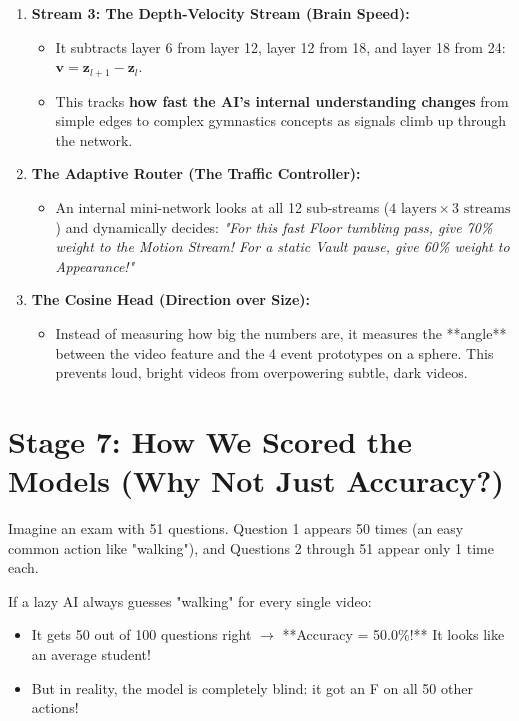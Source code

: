 \documentclass[a4paper, 11pt]{article}
\begin{document}
\begin{examplebox}
\begin{enumerate}
    \item \textbf{Stream 3: The Depth-Velocity Stream (Brain Speed):}
    \begin{itemize}
        \item It subtracts layer 6 from layer 12, layer 12 from 18, and layer 18 from 24: $\mathbf{v} = \mathbf{z}_{l+1} - \mathbf{z}_l$.
        \item This tracks \textbf{how fast the AI's internal understanding changes} from simple edges to complex gymnastics concepts as signals climb up through the network.
    \end{itemize}

    \item \textbf{The Adaptive Router (The Traffic Controller):}
    \begin{itemize}
        \item An internal mini-network looks at all 12 sub-streams ($4\text{ layers} \times 3\text{ streams}$) and dynamically decides: \textit{"For this fast Floor tumbling pass, give 70\% weight to the Motion Stream! For a static Vault pause, give 60\% weight to Appearance!"}
    \end{itemize}

    \item \textbf{The Cosine Head (Direction over Size):}
    \begin{itemize}
        \item Instead of measuring how big the numbers are, it measures the **angle** between the video feature and the 4 event prototypes on a sphere. This prevents loud, bright videos from overpowering subtle, dark videos.
    \end{itemize}
\end{enumerate}
\end{examplebox}

\section{Stage 7: How We Scored the Models (Why Not Just Accuracy?)}

\begin{conceptbox}
Imagine an exam with 51 questions. 
Question 1 appears 50 times (an easy common action like "walking"), and Questions 2 through 51 appear only 1 time each.

If a lazy AI always guesses "walking" for every single video:
\begin{itemize}
    \item It gets 50 out of 100 questions right $\rightarrow$ **Accuracy = 50.0\%!** It looks like an average student!
    \item But in reality, the model is completely blind: it got an F on all 50 other actions!
\end{itemize}
\end{conceptbox}
\end{document}
